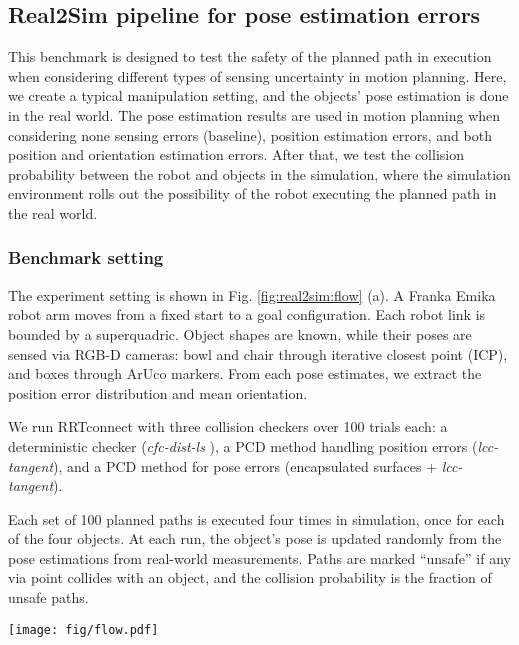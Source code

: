 \documentclass[conference]{IEEEtran}
\begin{document}
\subsection{Real2Sim pipeline for pose estimation errors}    

This benchmark is designed to test the safety of the planned path in execution when considering different types of sensing uncertainty in motion planning. Here, we create a typical manipulation setting, and the objects' pose estimation is done in the real world. The pose estimation results are used in motion planning when considering none sensing errors (baseline), position estimation errors, and both position and orientation estimation errors. After that, we test the collision probability between the robot and objects in the simulation, where the simulation environment rolls out the possibility of the robot executing the planned path in the real world. 

\subsubsection{Benchmark setting}
The experiment setting is shown in Fig. \ref{fig:real2sim:flow} (a).
A Franka Emika robot arm moves from a fixed start to a goal configuration. Each robot link is bounded by a superquadric. Object shapes are known, while their poses are sensed via RGB-D cameras: bowl and chair through iterative closest point (ICP), and boxes through ArUco markers. From each pose estimates, we extract the position error distribution and mean orientation.

We run RRTconnect with three collision checkers over 100 trials each: a deterministic checker (\textit{cfc-dist-ls} \cite{ruan2022collision}), a PCD method handling position errors (\textit{lcc-tangent}), and a PCD method for pose errors (encapsulated surfaces + \textit{lcc-tangent}).

Each set of 100 planned paths is executed four times in simulation, once for each of the four objects. At each run, the object's pose is updated randomly from the pose estimations from real-world measurements. Paths are marked “unsafe” if any via point collides with an object, and the collision probability is the fraction of unsafe paths.
 
\begin{figure*}[tb]
\centering
\texttt{[image: fig/flow.pdf]}
\caption{Real2Sim pipeline to evaluate the reliability of planned paths using different PCD methods. (a) A typical manipulation setting with four objects. (b) Perception results for each object. (c) Motion planning with different PCD methods. (d) Rolling out the possibility of the robot executing the planned path in simulation (Isaac Sim) and calculating the collision probability in execution. (e) A collision-free path in simulation is executed in the real world, which is planned under considering pose sensing uncertainty.  }
\label{fig:real2sim:flow}
\end{figure*}
\end{document}
